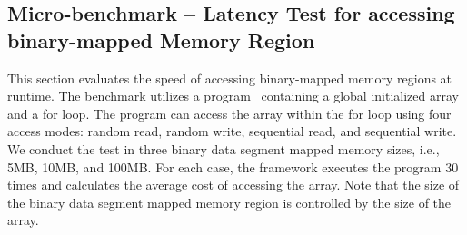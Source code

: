 \subsection{Micro-benchmark – Latency Test for accessing binary-mapped Memory Region}\label{accesiing_binary_mapped_memory}


    
     
     
     



 

This section evaluates the speed of accessing binary-mapped memory regions at runtime. The benchmark utilizes a program~\cite*{benchamark_micro} containing a global initialized array and a for loop. The program can access the array within the for loop using four access modes: random read, random write, 
sequential read, and sequential write. We conduct the test in three binary data segment mapped memory sizes, i.e., 5MB, 10MB, and 100MB. For each case, the framework executes the program 30 times and calculates the average cost of accessing the array. Note that the size of the binary data segment 
mapped memory region is controlled by the size of the array. 








